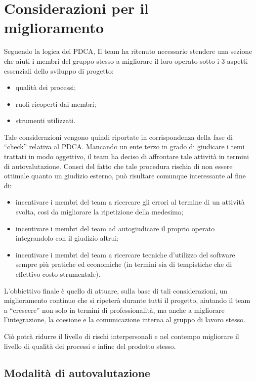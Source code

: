  
\section{Considerazioni per il miglioramento}

Seguendo la logica del PDCA, Il team ha ritenuto necessario stendere una sezione che aiuti i membri del gruppo stesso a migliorare il loro operato sotto i 3 aspetti essenziali dello sviluppo di progetto:

\begin{itemize}
	\item qualità dei processi;
	\item ruoli ricoperti dai membri;
	\item strumenti utilizzati.
\end{itemize}

Tale considerazioni vengono quindi riportate in corrispondenza della fase di ``check'' relativa al PDCA. Mancando un ente terzo in grado di giudicare i temi trattati in modo oggettivo, il team ha deciso di affrontare tale attività in termini di autovalutazione. Consci del fatto che tale procedura rischia di non essere ottimale quanto un giudizio esterno, può risultare comunque interessante al fine di:

\begin{itemize}
	\item incentivare i membri del team a ricercare gli errori al termine di un attività svolta, cosi da migliorare la ripetizione della medesima;
	\item incentivare i membri del team ad autogiudicare il proprio operato integrandolo con il giudizio altrui;
	\item incentivare i membri del team a ricercare tecniche d'utilizzo del software sempre più pratiche ed economiche (in termini sia di tempistiche che di effettivo costo strumentale).
\end{itemize}

L'obbiettivo finale è quello di attuare, sulla base di tali considerazioni, un miglioramento continuo che si ripeterà durante tutti il progetto, aiutando il team a ``crescere'' non solo in termini di professionalità, ma anche a migliorare l'integrazione, la coesione e la comunicazione interna al gruppo di lavoro stesso. 

Ciò potrà ridurre il livello di rischi interpersonali e nel contempo migliorare il livello di qualità dei processi e infine del prodotto stesso.

\subsection{Modalità di autovalutazione}

